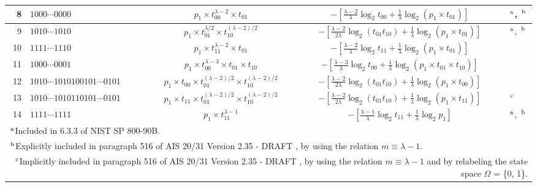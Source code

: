 ﻿\documentclass[a3paper,xelatex,english]{bxjsarticle}
\begin{document}
\begin{table}[htbp]
{\begin{tabular}{|r|l|c|c|l|}
\hline 
8 & $1000 \cdots 0000$ & $p_{1} \times t_{00}^{\lambda - 2} \times t_{01}$ & $-\left[ \frac{\lambda - 2}{\lambda} \log_{2} t_{00}+ \frac{1}{\lambda} \log_{2} \left( p_{1} \times t_{01} \right)\right]$ & $^{\textrm{\,a}}$, $^{\textrm{\,b}}$ \\
\hline 
9 & $1010 \cdots 1010$ & $p_{1} \times t_{01}^{\lambda / 2} \times t_{10}^{(\lambda - 2) / 2}$ & $-\left[ \frac{\lambda - 2}{2\lambda} \log_{2} \left( t_{01} t_{10} \right) + \frac{1}{\lambda} \log_{2} \left( p_{1} \times t_{01} \right) \right]$ & $^{\textrm{\,a}}$, $^{\textrm{\,b}}$ \\
\hline 
10 & $1111 \cdots 1110$ & $p_{1} \times t_{11}^{\lambda - 2} \times t_{01}$ & $-\left[ \frac{\lambda - 2}{\lambda} \log_{2} t_{11}+ \frac{1}{\lambda} \log_{2} \left( p_{1} \times t_{01} \right)\right]$ &  \\
\hline 
11 & $1000 \cdots 0001$ & $p_{1} \times t_{00}^{\lambda - 3} \times t_{01} \times t_{10}$ & $-\left[ \frac{\lambda - 3}{\lambda} \log_{2} t_{00} + \frac{1}{\lambda} \log_{2} \left( p_{1} \times t_{01} \times t_{10} \right) \right]$ &  \\
\hline
12 & $1010 \cdots 1010100101 \cdots 0101$ & $p_{1} \times t_{00} \times t_{01}^{(\lambda - 2) / 2} \times t_{10}^{(\lambda - 2) / 2}$ & $-\left[ \frac{\lambda - 2}{2\lambda} \log_{2} \left( t_{01} t_{10} \right) + \frac{1}{\lambda} \log_{2} \left( p_{1} \times t_{00} \right) \right]$ &  \\
\hline
13 & $1010 \cdots 1010110101 \cdots 0101$ & $p_{1} \times t_{11} \times t_{01}^{(\lambda - 2) / 2} \times t_{10}^{(\lambda - 2) / 2}$ & $-\left[ \frac{\lambda - 2}{2\lambda} \log_{2} \left( t_{01} t_{10} \right) + \frac{1}{\lambda} \log_{2} \left( p_{1} \times t_{11} \right) \right]$ & \qquad $^{\textrm{\,c}}$ \\
\hline 
14 & $1111 \cdots 1111$ & $p_{1} \times t_{11}^{\lambda - 1}$ & $-\left[ \frac{\lambda - 1}{\lambda} \log_{2} t_{11} + \frac{1}{\lambda} \log_{2} p_{1} \right]$ & $^{\textrm{\,a}}$, $^{\textrm{\,b}}$ \\
\hline 
\hline 
\multicolumn{5}{|l|}{$^{\textrm{\,a}}$\quad Included in 6.3.3 of NIST SP 800-90B\cite{SP80090B}.} \\ 
\multicolumn{5}{|l|}{$^{\textrm{\,b}}$\quad Explicitly included in paragraph 516 of AIS 20/31 Version 2.35 - DRAFT \cite{AIS31draft2022}, by using the relation $m \equiv \lambda - 1$.} \\ 
\multicolumn{5}{|p{17cm}|}{$^{\textrm{\,c}}$\quad Implicitly included in paragraph 516 of AIS 20/31 Version 2.35 - DRAFT \cite{AIS31draft2022}, by using the relation $m \equiv \lambda - 1$ and by relabeling the state space $\Omega$ = \{0, 1\}.} \\ 
\hline 
\end{tabular}
}
\end{table}
\end{document}
